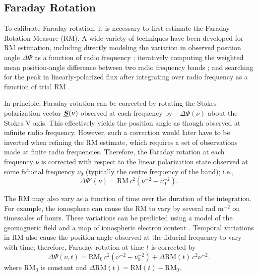 \subsection{ Faraday Rotation }
\label{sec:calibration_Faraday}

%
To calibrate Faraday rotation, it is necessary to first estimate the Faraday Rotation Measure (RM).  A wide variety of techniques have been developed for RM estimation, including 
%
directly modeling the variation in observed position angle $\Delta\Psi$ as a function of radio frequency \citep[e.g.,][]{njkk08};
%
iteratively computing the weighted
mean position-angle difference between
two radio frequency bands
\citep{hml+06,cvk+19};
%
and searching for the peak in linearly-polarized flux after integrating over radio frequency as a function of trial RM \citep[e.g.,][]{hbo05,2005A&A...441.1217B}.

In principle, Faraday rotation can be corrected by rotating the Stokes polarization vector $\underline{\mbox{\boldmath $S$}}(\nu)$ observed at each frequency by $-\Delta\Psi(\nu)$ about the Stokes V axis.
%
This effectively yields the position angle as though observed at infinite radio frequency.
However, such a correction would later have to be inverted when refining the RM estimate, which requires a set of observations  made at finite radio frequencies.
%
Therefore, the Faraday rotation at each frequency $\nu$ is corrected with respect to the linear polarization state observed at some fiducial frequency $\nu_0$ (typically the centre frequency of the band); i.e.,
\begin{equation}
\label{eqn:constant_RM}
    \Delta\Psi'(\nu) = \mathrm{RM} \, c^2 \left( \nu^{-2} - \nu_0^{-2} \right).
\end{equation} 

The RM may also vary as a function of time over the duration of the integration.
For example, the ionosphere can cause the RM to vary by several rad m$^{-2}$ on timescales of hours.  These variations can be predicted using a model of the geomagnetic field and a map of ionospheric electron content \citep[e.g.,][]{pnt+19}.
%
Temporal variations in RM also cause the position angle observed at the fiducial frequency to vary with time; therefore, Faraday rotation at time $t$ is corrected by
%
\begin{equation}
\label{eqn:variable_RM}
\Delta\Psi(\nu,t) 
  = \mathrm{RM}_0 \, c^2 \left( \nu^{-2} - \nu_0^{-2} \right)
  + \Delta\mathrm{RM}(t) \, c^2 \nu^{-2}.
\end{equation} 
%
where 
$\mathrm{RM}_0$ is constant 
and
$\Delta\mathrm{RM}(t)=\mathrm{RM}(t) - \mathrm{RM}_0$.
